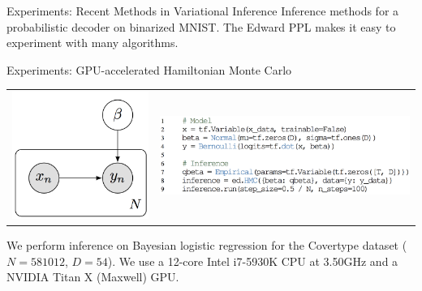 \documentclass[final]{beamer}
\begin{document}
\begin{frame}[t]
\begin{columns}[t]
\begin{column}{\onecolwid}
\begin{block}{Experiments: Recent Methods in Variational Inference}
Inference methods for a probabilistic decoder on binarized
MNIST. The Edward \acrshort{PPL} makes it easy to experiment with many algorithms.
\end{block}

\begin{block}{Experiments: GPU-accelerated Hamiltonian Monte Carlo}
\begin{tabular}{cc}
\hspace{-1em}
\includegraphics{img/logistic_graph.png}
&
\includegraphics{img/logistic_code.png}
\end{tabular}

We perform inference on Bayesian logistic regression for the
Covertype dataset ($N=581012$, $D=54$). We use a 12-core Intel i7-5930K
CPU at 3.50GHz and a NVIDIA Titan X (Maxwell) GPU.


\end{block}
\end{column}
\end{columns}
\end{frame}
\end{document}
